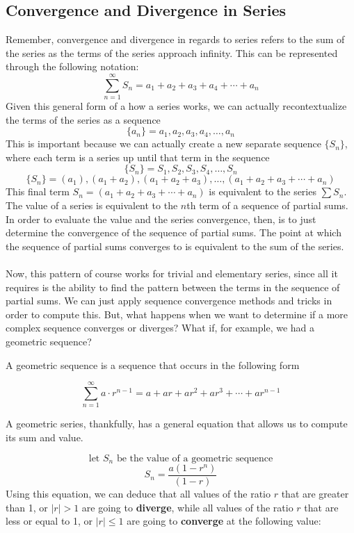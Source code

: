 \documentclass{report}
\begin{document}
\begin{sloppypar}
\subsection{Convergence and Divergence in Series}
Remember, convergence and divergence in regards to series refers
to the sum of the series as the terms of the series approach infinity.
This can be represented through the following notation:
\[ \sum_{n=1}^{\infty}S_{n} = a_{1} + a_{2} + a_{3} + a_{4} + \cdots + a_{n} \]
Given this general form of a how a series works, we can actually
recontextualize the terms of the series as a sequence
\[ \{a_{n}\} = a_{1}, a_{2} , a_{3}, a_{4}, \dots, a_{n} \]
This is important because we can actually create a new separate sequence
$ \{ S_{n}\}$, where each term is a series up until that term
in the sequence
\[ \{S_{n}\} = S_{1}, S_{2}, S_{3}, S_{4}, \dots, S_{n}\]
\[ \{S_{n}\} = (a_{1}), (a_{1} + a_{2}), (a_{1} + a_{2} + a_{3}), \dots, (a_{1} + a_{2} + a_{3} + \cdots + a_{n} ) \]
This final term $ S_{n} = (a_{1} + a_{2} + a_{3} + \cdots + a_{n} ) $ is equivalent
to the series $ \sum S_{n} $. The value of a series is equivalent to the
$n$th term of a sequence of partial sums. In order to evaluate the value and the
series convergence, then, is to just determine the convergence of the sequence
of partial sums. The point at which the sequence of partial sums converges to
is equivalent to the sum of the series.
\\
\\
Now, this pattern of course works for trivial and elementary series,
since all it requires is the ability to find the pattern
between the terms in the sequence of partial sums. We can just
apply sequence convergence methods and tricks in order to compute
this. But, what happens when we want to determine if a more
complex sequence converges or diverges? What if, for example, we
had a geometric sequence?
\par A geometric sequence is a sequence that occurs in the following form

\[ \sum_{n=1}^{\infty} a \cdot r^{n-1} = a + ar + ar^{2} + ar^{3} + \cdots + ar^{n-1}\]

A geometric series, thankfully, has a general equation that allows us to compute its
sum and value.

\[ \textrm{let $S_{n}$ be the value of a geometric sequence} \]
\[ S_{n} = \frac{a(1-r^{n})}{(1-r)} \]
Using this equation, we can deduce that all values of the ratio $ r $ that are greater
than 1, or $ |r| > 1 $ are going to \textbf{diverge}, while all values of the ratio
$ r $ that are less or equal to 1, or $ |r| \leq 1$ are going to \textbf{converge} at
the following value:


\end{sloppypar}
\end{document}
